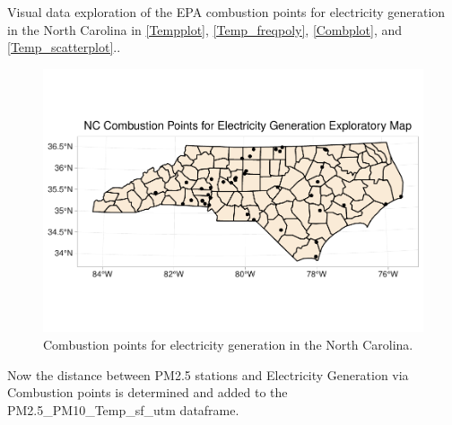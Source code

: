 \documentclass[12pt,]{article}
\begin{document}
Visual data exploration of the EPA combustion points for electricity
generation in the North Carolina in \autoref{Tempplot},
\autoref{Temp_freqpoly}, \autoref{Combplot}, and
\autoref{Temp_scatterplot}..

\begin{figure}
\centering
\includegraphics{./Outputunnamed-chunk-36-1.pdf}
\caption{Combustion points for electricity generation in the North
Carolina. \label{Combplot}}
\end{figure}

Now the distance between PM2.5 stations and Electricity Generation via
Combustion points is determined and added to the
PM2.5\_PM10\_Temp\_sf\_utm dataframe.
\end{document}
